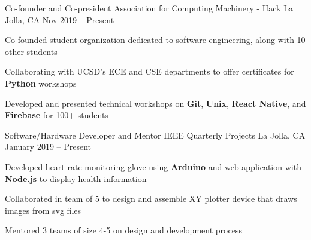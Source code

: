 \documentclass[]{awesome-cv}
\begin{document}
\vspace{-5mm}
\begin{cventries}
  \vspace{-1mm}
	\cventry
  {Co-founder and Co-president}
  {Association for Computing Machinery - Hack}
	{La Jolla, CA}
  {Nov 2019 – Present}
	{\begin{cvitems}
    \item {Co-founded student organization
      dedicated to software engineering, along with 10 other students}
    \item {Collaborating with UCSD's ECE and CSE departments to offer certificates
      for \textbf{Python} workshops}
    \item {Developed and presented technical workshops on \textbf{Git}, \textbf{Unix},
        \textbf{React Native}, and \textbf{Firebase} for 100+ students}
		\end{cvitems}}

	\vspace{-3mm}
	\cventry
  {Software/Hardware Developer and Mentor}
	{IEEE Quarterly Projects}
	{La Jolla, CA}
  {January 2019 – Present}
	{\begin{cvitems}
    \item {Developed heart-rate monitoring glove using \textbf{Arduino} and
      web application with \textbf{Node.js} to display health information}
    \item {Collaborated in team of 5 to design and assemble XY plotter device
      that draws images from svg files}
    \item {Mentored 3 teams of size 4-5 on design and development process}
		\end{cvitems}}



\end{cventries}
\end{document}
